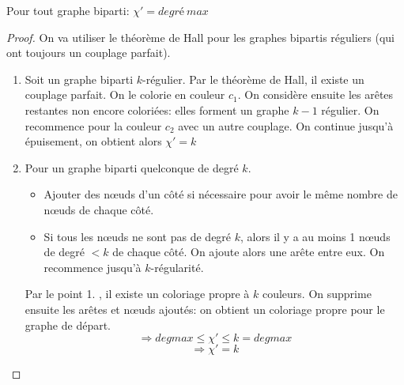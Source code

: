 \begin{mytheo}[König]
  Pour tout graphe biparti: $\chi '= degré\ max$
  \begin{proof}
    On va utiliser le théorème de Hall pour les graphes bipartis réguliers (qui ont toujours un couplage parfait).
    \begin{enumerate}


    \item Soit un graphe biparti $k$-régulier. Par le théorème de Hall, il existe un couplage parfait. On le colorie en couleur $c_{1}$. On considère ensuite les arêtes restantes non encore coloriées: elles forment un graphe $k-1$ régulier. On recommence pour la couleur $c_{2}$ avec un autre couplage. On continue jusqu'à épuisement, on obtient alors $\chi '=k$
    \item Pour un graphe biparti quelconque de degré $k$.
    \begin{itemize}
    \item Ajouter des nœuds d'un côté si nécessaire pour avoir le même nombre de nœuds de chaque côté.
    \item Si tous les nœuds ne sont pas de degré $k$, alors il y a au moins 1 nœuds de degré $<k$ de chaque côté. On ajoute alors une arête entre eux. On recommence jusqu'à $k$-régularité.
    \end{itemize}
    Par le point 1. , il existe un coloriage propre à $k$ couleurs. On supprime ensuite les arêtes et nœuds ajoutés: on obtient un coloriage propre pour le graphe de départ.
    $$\Rightarrow deg max \le \chi ' \le k=deg max$$
    $$\Rightarrow \chi ' = k$$
    \end{enumerate}
  \end{proof}
\end{mytheo}

